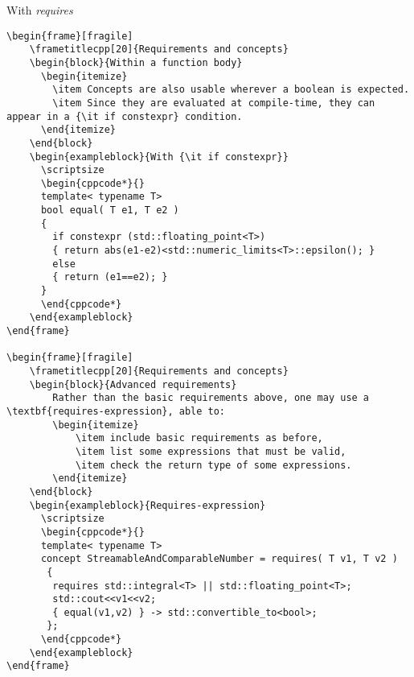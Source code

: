 \begin{frame}[fragile]
\begin{exampleblock}{With {\it requires}}
\begin{verbatim}
\begin{frame}[fragile]
    \frametitlecpp[20]{Requirements and concepts}
    \begin{block}{Within a function body}
      \begin{itemize}
        \item Concepts are also usable wherever a boolean is expected.
        \item Since they are evaluated at compile-time, they can appear in a {\it if constexpr} condition.
      \end{itemize}
    \end{block}
    \begin{exampleblock}{With {\it if constexpr}}
      \scriptsize
      \begin{cppcode*}{}
      template< typename T>
      bool equal( T e1, T e2 )
      {
        if constexpr (std::floating_point<T>)
        { return abs(e1-e2)<std::numeric_limits<T>::epsilon(); }
        else
        { return (e1==e2); }
      }
      \end{cppcode*}
    \end{exampleblock}
\end{frame}

\begin{frame}[fragile]
    \frametitlecpp[20]{Requirements and concepts}
    \begin{block}{Advanced requirements}
        Rather than the basic requirements above, one may use a \textbf{requires-expression}, able to:
        \begin{itemize}
            \item include basic requirements as before,
            \item list some expressions that must be valid,
            \item check the return type of some expressions.
        \end{itemize}
    \end{block}
    \begin{exampleblock}{Requires-expression}
      \scriptsize
      \begin{cppcode*}{}
      template< typename T>
      concept StreamableAndComparableNumber = requires( T v1, T v2 )
       {
        requires std::integral<T> || std::floating_point<T>;
        std::cout<<v1<<v2;
        { equal(v1,v2) } -> std::convertible_to<bool>;
       };
      \end{cppcode*}
    \end{exampleblock}
\end{frame}


\end{verbatim}
\end{exampleblock}
\end{frame}
